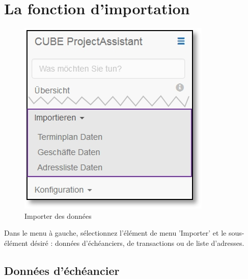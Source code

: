 
\clearpage
\section{La fonction d'importation}

\begin{figure}   %
  \vspace{-35pt}      %
  \begin{center}
    \includegraphics[width=1\linewidth]{../chapters/12_Importieren/pictures/12_Menu_Importieren.jpg}
  \end{center}
  \vspace{-20pt}
  \caption{Importer des données}
  \vspace{-10pt}
\end{figure}

Dans le menu à gauche, sélectionnez l'élément de menu 'Importer' et le sous-élément désiré : données d'échéanciers, de transactions ou de liste d'adresses.

\vspace{5.5cm}

\subsection{Données d'échéancier}
\label{bkm:Ref445411998}

